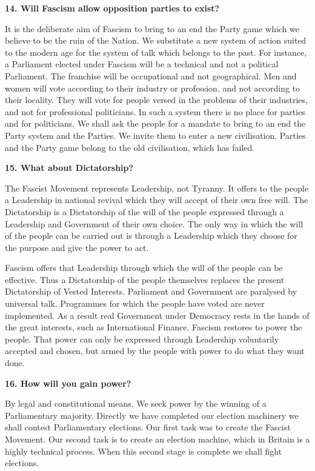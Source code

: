 \documentclass{book}
\begin{document}
\begin{flushleft}
\textbf{14. Will Fascism allow opposition parties to exist?}

It is the deliberate aim of Fascism to bring to an end the Party game which we believe to be the
ruin of the Nation. We substitute a new system of action suited to the modern age for the system
of talk which belongs to the past. For instance, a Parliament elected under Fascism will be a
technical and not a political Parliament. The franchise will be occupational and not geographical.
Men and women will vote according to their industry or profession, and not according to their
locality. They will vote for people versed in the problems of their industries, and not for
professional politicians. In such a system there is no place for parties and for politicians. We
shall ask the people for a mandate to bring to an end the Party system and the Parties. We invite
them to enter a new civilisation. Parties and the Party game belong to the old civilisation, which has failed.
\end{flushleft}

\begin{flushright}
\textbf{15. What about Dictatorship?}

The Fascist Movement represents Leadership, not Tyranny. It offers to the people a Leadership
in national revival which they will accept of their own free will. The Dictatorship is a
Dictatorship of the will of the people expressed through a Leadership and Government of their
own choice. The only way in which the will of the people can be carried out is through a
Leadership which they choose for the purpose and give the power to act.

Fascism offers that Leadership through which the will of the people can be effective. Thus a
Dictatorship of the people themselves replaces the present Dictatorship of Vested Interests.
Parliament and Government are paralysed by universal talk. Programmes for which the people
have voted are never implemented. As a result real Government under Democracy rests in the
hands of the great interests, such as International Finance. Fascism restores to power the people.
That power can only be expressed through Leadership voluntarily accepted and chosen, but
armed by the people with power to do what they want done.
\end{flushright}

\begin{flushleft}
    \textbf{16. How will you gain power?}

By legal and constitutional means. We seek power by the winning of a Parliamentary majority.
Directly we have completed our election machinery we shall contest Parliamentary elections.
Our first task was to create the Fascist Movement. Our second task is to create an election
machine, which in Britain is a highly technical process. When this second stage is complete we
shall fight elections.
\end{flushleft}
\end{document}
